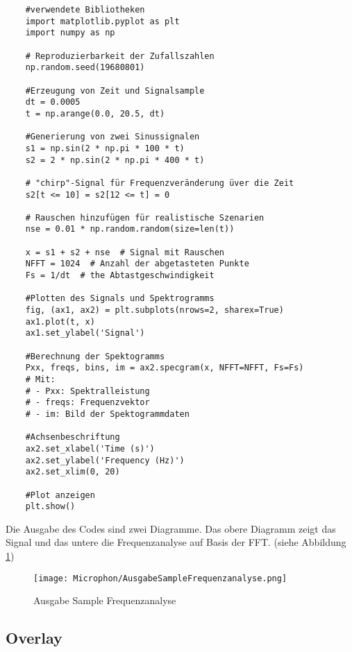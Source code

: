 \begin{verbatim}
    #verwendete Bibliotheken
    import matplotlib.pyplot as plt
    import numpy as np
    
    # Reproduzierbarkeit der Zufallszahlen
    np.random.seed(19680801)
    
    #Erzeugung von Zeit und Signalsample
    dt = 0.0005
    t = np.arange(0.0, 20.5, dt)
    
    #Generierung von zwei Sinussignalen
    s1 = np.sin(2 * np.pi * 100 * t)
    s2 = 2 * np.sin(2 * np.pi * 400 * t)
    
    # "chirp"-Signal für Frequenzveränderung üver die Zeit
    s2[t <= 10] = s2[12 <= t] = 0
    
    # Rauschen hinzufügen für realistische Szenarien
    nse = 0.01 * np.random.random(size=len(t))
    
    x = s1 + s2 + nse  # Signal mit Rauschen
    NFFT = 1024  # Anzahl der abgetasteten Punkte
    Fs = 1/dt  # the Abtastgeschwindigkeit
    
    #Plotten des Signals und Spektrogramms
    fig, (ax1, ax2) = plt.subplots(nrows=2, sharex=True)
    ax1.plot(t, x)
    ax1.set_ylabel('Signal')
    
    #Berechnung der Spektogramms
    Pxx, freqs, bins, im = ax2.specgram(x, NFFT=NFFT, Fs=Fs)
    # Mit:
    # - Pxx: Spektralleistung
    # - freqs: Frequenzvektor
    # - im: Bild der Spektogrammdaten
    
    #Achsenbeschriftung
    ax2.set_xlabel('Time (s)')
    ax2.set_ylabel('Frequency (Hz)')
    ax2.set_xlim(0, 20)
    
    #Plot anzeigen
    plt.show()
\end{verbatim}

Die Ausgabe des Codes sind zwei Diagramme. Das obere Diagramm zeigt das  Signal und das untere die Frequenzanalyse auf Basis der FFT. (siehe Abbildung \ref{fig: Sampleaugabe Frequenzanalyse})

\begin{figure}[ht]
    \centering
    \texttt{[image: Microphon/AusgabeSampleFrequenzanalyse.png]}
    \caption{Ausgabe Sample Frequenzanalyse}
    \label{fig: Sampleaugabe Frequenzanalyse}
\end{figure}

\subsection{Overlay}

